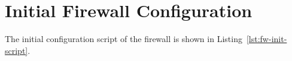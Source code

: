 \section{Initial Firewall Configuration} \label{app:fw-init}

The initial configuration script of the firewall is shown in
Listing~\ref{lst:fw-init-script}.


